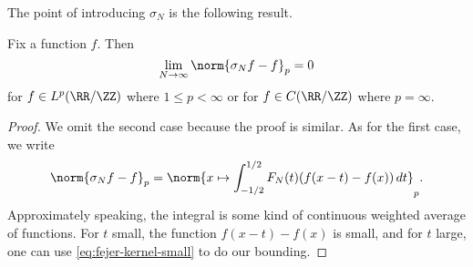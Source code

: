 \documentclass[../notes.tex]{subfiles}
\begin{document}
The point of introducing $\sigma_N$ is the following result.
\begin{theorem}
	Fix a function $f$. Then
	\[\lim_{N\to\infty}\norm{\sigma_Nf-f}_p=0\]
	for $f\in L^p(\RR/\ZZ)$ where $1\le p<\infty$ or for $f\in C(\RR/\ZZ)$ where $p=\infty$.
\end{theorem}
\begin{proof}
	We omit the second case because the proof is similar. As for the first case, we write
	\[\norm{\sigma_Nf-f}_p=\norm{x\mapsto\int_{-1/2}^{1/2}F_N(t)(f(x-t)-f(x))\,dt}_p.\]
	Approximately speaking, the integral is some kind of continuous weighted average of functions. For $t$ small, the function $f(x-t)-f(x)$ is small, and for $t$ large, one can use \eqref{eq:fejer-kernel-small} to do our bounding.
\end{proof}
\end{document}

